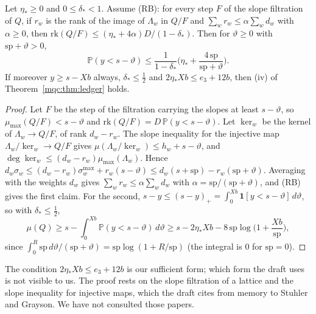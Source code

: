 \begin{proposition}\label{mqc:prop:tail}
Let $\eta_*\ge0$ and $0\le\delta_*<1$. Assume (RB): for every step $F$ of the slope filtration of $Q$, if $r_w$ is the rank of the image of $\Lambda_w$ in $Q/F$ and $\sum_wr_w\le\alpha\sum_wd_w$ with $\alpha\ge0$, then $\mathrm{rk}(Q/F)\le(\eta_*+4\alpha)D/(1-\delta_*)$. Then for $\vartheta\ge0$ with $\mathrm{sp}+\vartheta>0$,
\[
\mathbb P(y<s-\vartheta)\le\frac1{1-\delta_*}\Big(\eta_*+\frac{4\,\mathrm{sp}}{\mathrm{sp}+\vartheta}\Big).
\]
If moreover $y\ge s-Xb$ always, $\delta_*\le\frac12$ and $2\eta_*Xb\le e_3+12b$, then (iv) of Theorem~\ref{mqc:thm:ledger} holds.
\end{proposition}

\begin{proof}
Let $F$ be the step of the filtration carrying the slopes at least $s-\vartheta$, so $\mu_{\max}(Q/F)<s-\vartheta$ and $\mathrm{rk}(Q/F)=D\,\mathbb P(y<s-\vartheta)$. Let $\ker_w$ be the kernel of $\Lambda_w\to Q/F$, of rank $d_w-r_w$. The slope inequality for the injective map $\Lambda_w/\ker_w\to Q/F$ gives $\mu(\Lambda_w/\ker_w)\le h_w+s-\vartheta$, and $\deg\ker_w\le(d_w-r_w)\mu_{\max}(\Lambda_w)$. Hence $d_w\sigma_w\le(d_w-r_w)\sigma_w^{\max}+r_w(s-\vartheta)\le d_w(s+\mathrm{sp})-r_w(\mathrm{sp}+\vartheta)$. Averaging with the weights $d_w$ gives $\sum_wr_w\le\alpha\sum_wd_w$ with $\alpha=\mathrm{sp}/(\mathrm{sp}+\vartheta)$, and (RB) gives the first claim. For the second, $s-y\le(s-y)_+=\int_0^{Xb}\mathbf 1[y<s-\vartheta]\,d\vartheta$, so with $\delta_*\le\frac12$,
\[
\mu(Q)\ge s-\int_0^{Xb}\mathbb P(y<s-\vartheta)\,d\vartheta\ge s-2\eta_*Xb-8\,\mathrm{sp}\log\Big(1+\frac{Xb}{\mathrm{sp}}\Big),
\]
since $\int_0^R\mathrm{sp}\,d\vartheta/(\mathrm{sp}+\vartheta)=\mathrm{sp}\log(1+R/\mathrm{sp})$ (the integral is $0$ for $\mathrm{sp}=0$).
\end{proof}

The condition $2\eta_*Xb\le e_3+12b$ is our sufficient form; which form the draft uses is not visible to us. The proof rests on the slope filtration of a lattice and the slope inequality for injective maps, which the draft cites from memory to Stuhler and Grayson. We have not consulted those papers.

